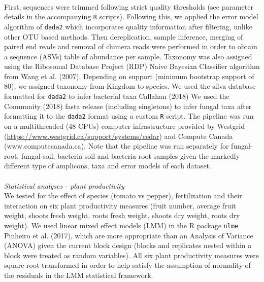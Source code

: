 \documentclass[11pt,]{article}
\begin{document}
\hspace*{0.333em}\\
First, sequences were trimmed following strict quality thresholds (see
parameter details in the accompanying \texttt{R} scripts). Following
this, we applied the error model algorithm of \texttt{dada2} which
incorporates quality information after filtering, unlike other OTU based
methods. Then dereplication, sample inference, merging of paired end
reads and removal of chimera reads were performed in order to obtain a
sequence (ASVs) table of abundance per sample. Taxonomy was also
assigned using the Ribosomal Database Project (RDP) Naive Bayesian
Classifier algorithm from Wang et al. (2007). Depending on support
(minimum bootstrap support of 80), we assigned taxonomy from Kingdom to
species. We used the silva database formatted for \texttt{dada2} to
infer bacterial taxa Callahan (2018) We used the Community (2018) fasta
release (including singletons) to infer fungal taxa after formatting it
to the \texttt{dada2} format using a custom \texttt{R} script. The
pipeline was run on a multithreaded (48 CPUs) computer infrastructure
provided by Westgrid
(\url{https://www.westgrid.ca/support/systems/cedar}) and Compute Canada
(www.computecanada.ca). Note that the pipeline was run separately for
fungal-root, fungal-soil, bacteria-soil and bacteria-root samples given
the markedly different type of amplicons, taxa and error models of each
dataset. ~\\
\hspace*{0.333em}\\
\emph{Statistical analyses - plant productivity}\\
We tested for the effect of species (tomato vs pepper), fertilization
and their interaction on six plant productivity measures (fruit number,
average fruit weight, shoots fresh weight, roots fresh weight, shoots
dry weight, roots dry weight). We used linear mixed effect models (LMM)
in the R package \texttt{nlme} Pinheiro et al. (2017), which are more
appropriate than an Analysis of Variance (ANOVA) given the current block
design (blocks and replicates nested within a block were treated as
random variables). All six plant productivity measures were square root
transformed in order to help satisfy the assumption of normality of the
residuals in the LMM statistical framework.\\
\hspace*{0.333em}\\
\hspace*{0.333em}\\
\end{document}
